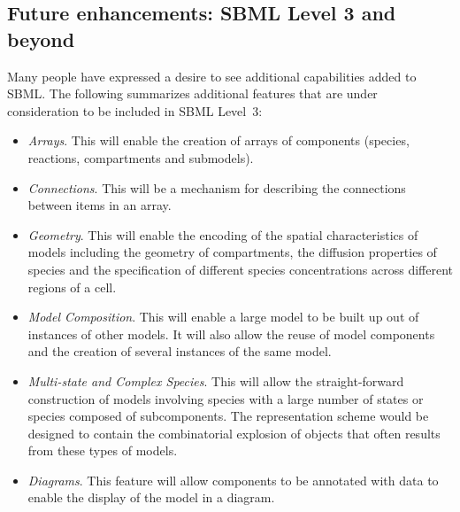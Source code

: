 \subsection{Future enhancements: SBML Level 3 and beyond}
\label{sec:level-3}

Many people have expressed a desire to see additional capabilities
added to SBML.  The following summarizes additional features that
are under consideration to be included in SBML Level~3:
\begin{itemize}
  
\item \emph{Arrays}.  This will enable the creation of arrays of
  components (species, reactions, compartments and submodels).
  
\item \emph{Connections}.  This will be a mechanism for describing
  the connections between items in an array.
  
\item \emph{Geometry}.  This will enable the encoding of the
  spatial characteristics of models including the geometry of
  compartments, the diffusion properties of species and the
  specification of different species concentrations across
  different regions of a cell.
  
\item \emph{Model Composition}.  This will enable a large model to
  be built up out of instances of other models.  It will also
  allow the reuse of model components and the creation of several
  instances of the same model.
  
\item \emph{Multi-state and Complex Species}.  This will allow the
  straight-forward construction of models involving species with a
  large number of states or species composed of subcomponents.
  The representation scheme would be designed to contain the
  combinatorial explosion of objects that often results from these
  types of models.
  
\item \emph{Diagrams}.  This feature will allow components to be
  annotated with data to enable the display of the model in a
  diagram.
  

\end{itemize}
